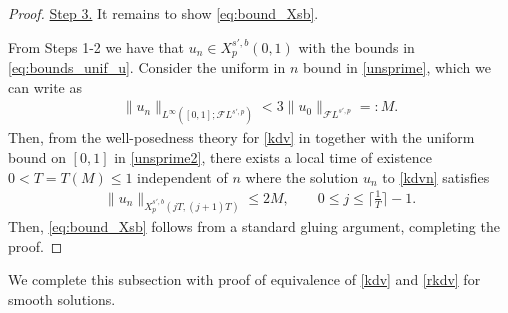 \documentclass[a4paper,
11pt,  reqno]{amsart}
\newcommand{\5}{\textup{V}}
\newcommand{\FL}{\mathcal{F} L}
\theoremstyle{remark}
\numberwithin{equation}{section}
\numberwithin{theorem}{section}
\begin{document}
\begin{proof}
\smallskip
\noindent\underline{Step 3.}
It remains to show \eqref{eq:bound_Xsb}.

From Steps 1-2 we have that $u_n \in X^{s', b}_p(0,1)$ with the bounds in \eqref{eq:bounds_unif_u}.
Consider the uniform in $n$ bound in \eqref{unsprime}, which we can write as
\begin{align}\label{unsprime2}
\| u_n \|_{L^\infty([0,1]; \FL^{s',p})} < 3 \|u_0\|_{\FL^{s',p}} = : M.
\end{align}
Then, from the well-posedness theory for \eqref{kdv} in \cite{Grunrock_ldv_hier} together with the uniform bound on $[0,1]$ in \eqref{unsprime2}, there exists a local time of existence $0<T = T(M)\le 1 $ independent of $n$ where the solution $u_n$ to \eqref{kdvn} satisfies
\begin{align}
\| u_n \|_{X^{s',b}_p(jT,(j+1)T)} \le 2 M , \qquad 0\le j \le \lceil \tfrac1T \rceil -1 .
\end{align}
Then, \eqref{eq:bound_Xsb} follows from a standard gluing argument, completing the proof. \qedhere


\end{proof}





We complete this subsection with proof of equivalence of \eqref{kdv} and \eqref{rkdv} for smooth solutions.
\end{document}
